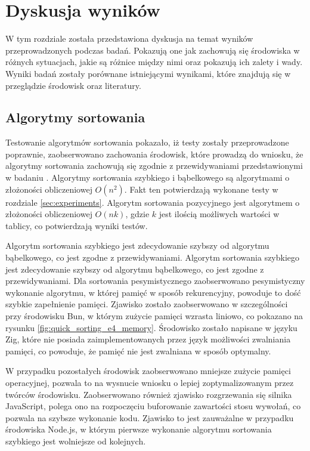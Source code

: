 \section{Dyskusja wyników}
W tym rozdziale została przedstawiona dyskusja na temat wyników przeprowadzonych podczas badań. Pokazują one jak zachowują się środowiska w różnych sytuacjach, jakie są różnice między nimi oraz pokazują ich zalety i wady. Wyniki badań zostały porównane istniejącymi wynikami, które znajdują się w przeglądzie środowisk oraz literatury.

\subsection{Algorytmy sortowania}
Testowanie algorytmów sortowania pokazało, iż testy zostały przeprowadzone poprawnie, zaobserwowano zachowania środowisk, które prowadzą do wniosku, że algorytmy sortowania zachowują się zgodnie z przewidywaniami przedstawionymi w badaniu \cite{sorting}. Algorytmy sortowania szybkiego i bąbelkowego są algorytmami o złożoności obliczeniowej $O(n^2)$. Fakt ten potwierdzają wykonane testy w rozdziale \ref{sec:experiments}. Algorytm sortowania pozycyjnego jest algorytmem o złożoności obliczeniowej $O(nk)$, gdzie $k$ jest ilością możliwych wartości w tablicy, co potwierdzają wyniki testów.

Algorytm sortowania szybkiego jest zdecydowanie szybszy od algorytmu bąbelkowego, co jest zgodne z przewidywaniami. Algorytm sortowania szybkiego jest zdecydowanie szybszy od algorytmu bąbelkowego, co jest zgodne z przewidywaniami. Dla sortowania pesymistycznego zaobserwowano pesymistyczny wykonanie algorytmu, w której pamięć w sposób rekurencyjny, powoduje to dość szybkie zapełnienie pamięci. Zjawisko zostało zaobserwowano w szczególności przy środowisku Bun, w którym zużycie pamięci wzrasta liniowo, co pokazano na rysunku \ref{fig:quick_sorting_e4_memory}. Środowisko zostało napisane w języku Zig, które nie posiada zaimplementowanych przez język możliwości zwalniania pamięci, co powoduje, że pamięć nie jest zwalniana w sposób optymalny. 

W przypadku pozostałych środowisk zaobserwowano mniejsze zużycie pamięci operacyjnej, pozwala to na wysnucie wniosku o lepiej zoptymalizowanym przez twórców środowisku. Zaobserwowano również zjawisko rozgrzewania się silnika JavaScript, polega ono na rozpoczęciu buforowanie zawartości stosu wywołań, co pozwala na szybsze wykonanie kodu. Zjawisko to jest zauważalne w przypadku środowiska Node.js, w którym pierwsze wykonanie algorytmu sortowania szybkiego jest wolniejsze od kolejnych.

